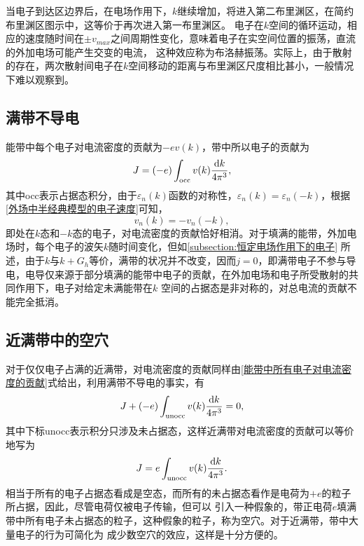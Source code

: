             当电子到达区边界后，在电场作用下，$k$继续增加，将进入第二布里渊区，在简约布里渊区图示中，这等价于再次进入第一布里渊区。
            电子在$k$空间的循环运动，相应的速度随时间在$\pm v_{max}$之间周期性变化，意味着电子在实空间位置的振荡，直流的外加电场可能产生交变的电流，
            这种效应称为布洛赫振荡。实际上，由于散射的存在，两次散射间电子在$k$空间移动的距离与布里渊区尺度相比甚小，一般情况下难以观察到。

        \subsection{满带不导电}
            能带中每个电子对电流密度的贡献为$-ev(k)$，带中所以电子的贡献为
            \begin{equation}
                J=(-e)\int_{\mathrm{occ}}v(k)\frac{\mathop{}\!\mathrm{d} k}{4\pi^3}\label{能带中所有电子对电流密度的贡献},
            \end{equation}
            其中occ表示占据态积分，由于$\varepsilon_n(k)$函数的对称性，$\varepsilon_n(k)=\varepsilon_n(-k)$，根据\autoref{外场中半经典模型的电子速度}可知，
            \begin{equation}
                v_n(k)=-v_n(-k),
            \end{equation}
            即处在$k$态和$-k$态的电子，对电流密度的贡献恰好相消。对于填满的能带，外加电场时，每个电子的波矢$k$随时间变化，但如\autoref{subsection:恒定电场作用下的电子}
            所述，由于$k$与$k+G_h$等价，满带的状况并不改变，因而$j=0$，即满带电子不参与导电，电导仅来源于部分填满的能带中电子的贡献，在外加电场和电子所受散射的共同作用下，电子对给定未满能带在$k$
            空间的占据态是非对称的，对总电流的贡献不能完全抵消。
        
        \subsection{近满带中的空穴}
            对于仅仅电子占满的近满带，对电流密度的贡献同样由\autoref{能带中所有电子对电流密度的贡献}式给出，利用满带不导电的事实，有
            \begin{equation}
                J+(-e)\int_{\mathrm{unocc}}^{}v(k)\frac{\mathop{}\!\mathrm{d} k}{4\pi^3}=0,
            \end{equation}
            其中下标unocc表示积分只涉及未占据态，这样近满带对电流密度的贡献可以等价地写为
            \begin{equation}
                J=e\int_{\mathrm{unocc}}^{}v(k)\frac{\mathop{}\!\mathrm{d} k}{4\pi^3}.                
            \end{equation}
            相当于所有的电子占据态看成是空态，而所有的未占据态看作是电荷为$+e$的粒子所占据，因此，尽管电荷仅被电子传输，但可以
            引入一种假象的，带正电荷$e$填满带中所有电子未占据态的粒子，这种假象的粒子，称为空穴。对于近满带，带中大量电子的行为可简化为
            成少数空穴的效应，这样是十分方便的。

